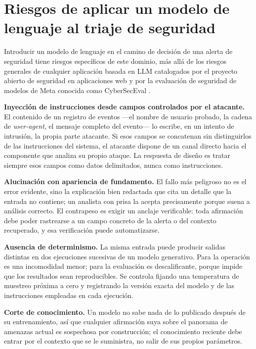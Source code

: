 \section{Riesgos de aplicar un modelo de lenguaje al triaje de seguridad}

Introducir un modelo de lenguaje en el camino de decisión de una alerta de seguridad tiene riesgos
específicos de este dominio, más allá de los riesgos generales de cualquier aplicación basada en
LLM catalogados por el proyecto abierto de seguridad en aplicaciones web \cite{owaspllmtop10} y por
la evaluación de seguridad de modelos de Meta conocida como CyberSecEval \cite{purplellama}.

\textbf{Inyección de instrucciones desde campos controlados por el atacante.} El contenido de un
registro de eventos ---el nombre de usuario probado, la cadena de \emph{user-agent}, el mensaje
completo del evento--- lo escribe, en un intento de intrusión, la propia parte atacante. Si esos
campos se concatenan sin distinguirlos de las instrucciones del sistema, el atacante dispone de un
canal directo hacia el componente que analiza su propio ataque. La respuesta de diseño es tratar
siempre esos campos como datos delimitados, nunca como instrucciones.

\textbf{Alucinación con apariencia de fundamento.} El fallo más peligroso no es el error evidente,
sino la explicación bien redactada que cita un detalle que la entrada no contiene; un analista con
prisa la acepta precisamente porque suena a análisis correcto. El contrapeso es exigir un anclaje
verificable: toda afirmación debe poder rastrearse a un campo concreto de la alerta o del contexto
recuperado, y esa verificación puede automatizarse.

\textbf{Ausencia de determinismo.} La misma entrada puede producir salidas distintas en dos
ejecuciones sucesivas de un modelo generativo. Para la operación es una incomodidad menor; para la
evaluación es descalificante, porque impide que los resultados sean reproducibles. Se controla
fijando una temperatura de muestreo próxima a cero y registrando la versión exacta del modelo y de
las instrucciones empleadas en cada ejecución.

\textbf{Corte de conocimiento.} Un modelo no sabe nada de lo publicado después de su entrenamiento,
así que cualquier afirmación suya sobre el panorama de amenazas actual es sospechosa por
construcción; el conocimiento reciente debe entrar por el contexto que se le suministra, no salir
de sus propios parámetros.

